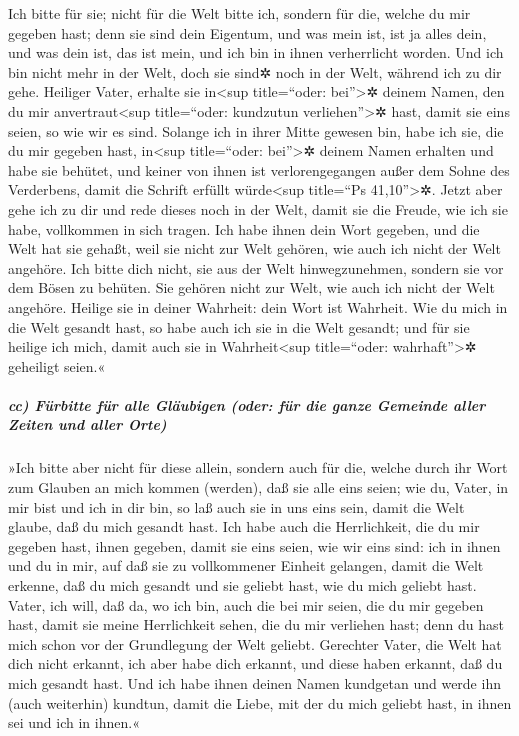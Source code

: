  Ich bitte für sie; nicht für die Welt bitte ich, sondern
für die, welche du mir gegeben hast; denn sie sind dein Eigentum,
 und was mein ist, ist ja alles dein, und was dein ist,
das ist mein, und ich bin in ihnen verherrlicht worden. 
Und ich bin nicht mehr in der Welt, doch sie sind✲ noch in der Welt,
während ich zu dir gehe. Heiliger Vater, erhalte sie in\textless sup
title=``oder: bei''\textgreater✲ deinem Namen, den du mir
anvertraut\textless sup title=``oder: kundzutun verliehen''\textgreater✲
hast, damit sie eins seien, so wie wir es sind.  Solange
ich in ihrer Mitte gewesen bin, habe ich sie, die du mir gegeben hast,
in\textless sup title=``oder: bei''\textgreater✲ deinem Namen erhalten
und habe sie behütet, und keiner von ihnen ist verlorengegangen außer
dem Sohne des Verderbens, damit die Schrift erfüllt würde\textless sup
title=``Ps 41,10''\textgreater✲.  Jetzt aber gehe ich zu
dir und rede dieses noch in der Welt, damit sie die Freude, wie ich sie
habe, vollkommen in sich tragen.  Ich habe ihnen dein
Wort gegeben, und die Welt hat sie gehaßt, weil sie nicht zur Welt
gehören, wie auch ich nicht der Welt angehöre.  Ich bitte
dich nicht, sie aus der Welt hinwegzunehmen, sondern sie vor dem Bösen
zu behüten.  Sie gehören nicht zur Welt, wie auch ich
nicht der Welt angehöre.  Heilige sie in deiner Wahrheit:
dein Wort ist Wahrheit.  Wie du mich in die Welt gesandt
hast, so habe auch ich sie in die Welt gesandt;  und für
sie heilige ich mich, damit auch sie in Wahrheit\textless sup
title=``oder: wahrhaft''\textgreater✲ geheiligt seien.«

\hypertarget{cc-fuxfcrbitte-fuxfcr-alle-gluxe4ubigen-oder-fuxfcr-die-ganze-gemeinde-aller-zeiten-und-aller-orte}{%
\subparagraph{cc) Fürbitte für alle Gläubigen (oder: für die ganze
Gemeinde aller Zeiten und aller
Orte)}\label{cc-fuxfcrbitte-fuxfcr-alle-gluxe4ubigen-oder-fuxfcr-die-ganze-gemeinde-aller-zeiten-und-aller-orte}}

 »Ich bitte aber nicht für diese allein, sondern auch für
die, welche durch ihr Wort zum Glauben an mich kommen (werden),
 daß sie alle eins seien; wie du, Vater, in mir bist und
ich in dir bin, so laß auch sie in uns eins sein, damit die Welt glaube,
daß du mich gesandt hast.  Ich habe auch die
Herrlichkeit, die du mir gegeben hast, ihnen gegeben, damit sie eins
seien, wie wir eins sind:  ich in ihnen und du in mir,
auf daß sie zu vollkommener Einheit gelangen, damit die Welt erkenne,
daß du mich gesandt und sie geliebt hast, wie du mich geliebt hast.
 Vater, ich will, daß da, wo ich bin, auch die bei mir
seien, die du mir gegeben hast, damit sie meine Herrlichkeit sehen, die
du mir verliehen hast; denn du hast mich schon vor der Grundlegung der
Welt geliebt.  Gerechter Vater, die Welt hat dich nicht
erkannt, ich aber habe dich erkannt, und diese haben erkannt, daß du
mich gesandt hast.  Und ich habe ihnen deinen Namen
kundgetan und werde ihn (auch weiterhin) kundtun, damit die Liebe, mit
der du mich geliebt hast, in ihnen sei und ich in ihnen.«

